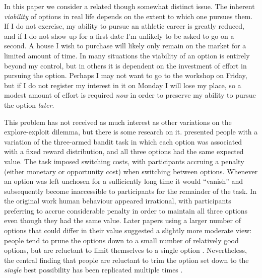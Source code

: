 \documentclass[a4paper,doc,natbib]{apa6}
\begin{document}
In this paper we consider a related though somewhat distinct issue. The inherent {\it viability} of options in real life depends on the extent to which one pursues them. If I do not exercise, my ability to pursue an athletic career is greatly reduced, and if I do not show up for a first date I'm unlikely to be asked to go on a second. A house I wish to purchase will likely only remain on the market for a limited amount of time. In many situations the viability of an option is entirely beyond my control, but in others it is dependent on the investment of effort in pursuing the option. Perhaps I may not want to go to the workshop on Friday, but if I do not register my interest in it on Monday I will lose my place, so a modest amount of effort is required {\it now} in order to preserve my ability to pursue the option  {\it later}.

This problem has not received as much interest as other variations on the explore-exploit dilemma, but there is some research on it. \cite{shin2004keeping} presented people with a variation of the three-armed bandit task in which each option was associated with a fixed reward distribution, and all three options had the same expected value. The task imposed switching costs, with participants accruing a penalty (either monetary or opportunity cost) when switching between options. Whenever an option was left unchosen for a sufficiently long time it would ``vanish'' and subsequently become inaccessible to participants for the remainder of the task. In the original work human behaviour appeared irrational, with participants preferring to accrue considerable penalty in order to maintain all three options even though they had the same value. Later papers using a larger number of options that could differ in their value suggested a slightly more moderate view: people tend to prune the options down to a small number of relatively good options, but are reluctant to limit themselves to a single option \citep{ejova2009walk}. Nevertheless, the central finding that people are reluctant to trim the option set down to the {\it single} best possibility has been replicated multiple times \citep{bonney2016investigations,ejova2009walk,neth2014foraging}.
\end{document}

